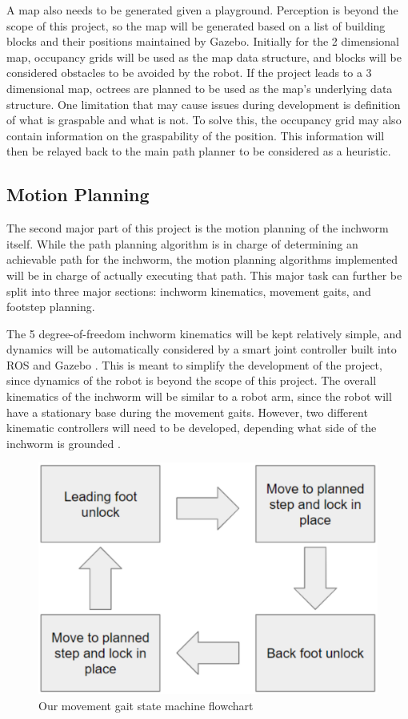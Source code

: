 A map also needs to be generated given a playground. Perception is beyond the scope of this project, so the map will be generated based on a list of building blocks and their positions maintained by Gazebo. Initially for the 2 dimensional map, occupancy grids will be used as the map data structure, and blocks will be considered obstacles to be avoided by the robot. If the project leads to a 3 dimensional map, octrees are planned to be used as the map’s underlying data structure. One limitation that may cause issues during development is definition of what is graspable and what is not. To solve this, the occupancy grid may also contain information on the graspability of the position. This information will then be relayed back to the main path planner to be considered as a heuristic.

\subsection{Motion Planning}
The second major part of this project is the motion planning of the inchworm itself. While the path planning algorithm is in charge of determining an achievable path for the inchworm, the motion planning algorithms implemented will be in charge of actually executing that path. This major task can further be split into three major sections: inchworm kinematics, movement gaits, and footstep planning.

The 5 degree-of-freedom inchworm kinematics will be kept relatively simple, and dynamics will be automatically considered by a smart joint controller built into ROS and Gazebo \cite{ROSControl}. This is meant to simplify the development of the project, since dynamics of the robot is beyond the scope of this project. The overall kinematics of the inchworm will be similar to a robot arm, since the robot will have a stationary base during the movement gaits. However, two different kinematic controllers will need to be developed, depending what side of the inchworm is grounded \cite{PlanarInchWormDesign}.

\begin{figure}[ht]
    \includegraphics[width=\linewidth]{figures/GaitFlowChart.png}
    \caption{Our movement gait state machine flowchart}
    \label{fig:GaitFlowChart}
\end{figure} 

